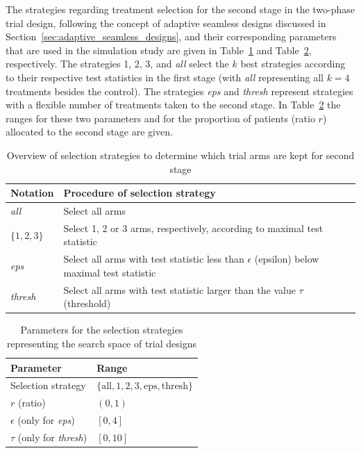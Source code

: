 \documentclass[bimj,fleqn]{w-art}
\theoremstyle{plain}
\theoremstyle{definition}
\begin{document}
The strategies regarding treatment selection for the second stage in the two-phase trial design, following the concept of adaptive seamless designs discussed in Section~\ref{sec:adaptive_seamless_designs}, and their corresponding parameters that are used in the simulation study are given in Table~\ref{tab:selection_strategies} and Table~\ref{tab:search_space}, respectively.
The strategies 1, 2, 3, and \emph{all} select the $k$ best strategies according to their respective test statistics in the first stage (with \emph{all} representing all $k=4$ treatments besides the control). 
The strategies \emph{eps} and \emph{thresh} represent strategies with a flexible number of treatments taken to the second stage. 
In Table~\ref{tab:search_space} the ranges for these two parameters and for the proportion of patients (ratio $r$) allocated to the second stage are given.
\begin{table}[h]
  \caption{Overview of selection strategies to determine which trial arms are kept for second stage}
  \label{tab:selection_strategies}
  \centering
  \begin{tabular}{ll}
  \hline
  Notation       & Procedure of selection strategy  \\
  \hline
  \emph{all}     & Select all arms  \\
  $\{1,2,3\}$    & Select 1, 2 or 3 arms, respectively, according to maximal test statistic \\
  \emph{eps}     & Select all arms with test statistic less than $\epsilon$ (epsilon) below maximal test statistic \\
  \emph{thresh}  & Select all arms with test statistic larger than the value $\tau$ (threshold) \\
  \hline
  \end{tabular}
\end{table}
\begin{table}[h]
  \caption{Parameters for the selection strategies representing the search space of trial designs}
  \label{tab:search_space}
  \centering
  \begin{tabular}{ll}
  \hline
  Parameter                        & Range \\
  \hline
  Selection strategy               & $\{\text{all}, 1, 2, 3, \text{eps}, \text{thresh} \}$ \\
  $r$ (ratio)                      & $(0,1)$ \\
  $\epsilon$ (only for \emph{eps}) & $[0,4]$ \\
  $\tau$ (only for \emph{thresh})  & $[0,10]$ \\
  \hline
  \end{tabular}
\end{table}
\end{document}
